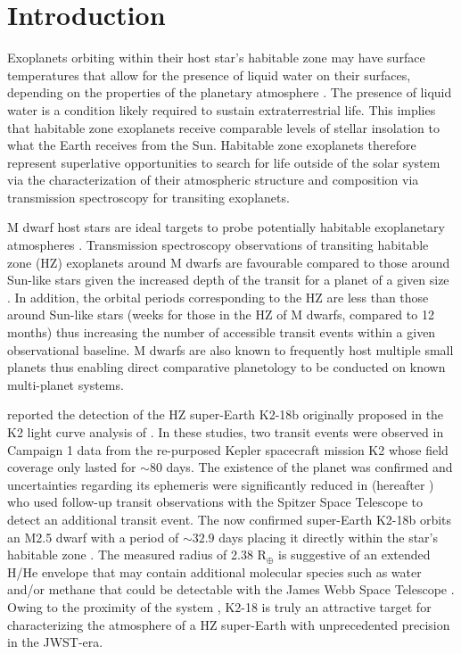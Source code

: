 \section{Introduction}
Exoplanets orbiting within their host star's habitable zone may have surface temperatures that allow
for the presence of liquid water on their surfaces, depending on the properties of the planetary
atmosphere \citep{kasting93}. The presence of liquid water is a condition likely required to sustain extraterrestrial life.
This implies that habitable zone exoplanets receive comparable levels of stellar insolation to what the Earth
receives from the Sun. Habitable zone exoplanets therefore represent superlative opportunities to
search for life outside of the solar system via the characterization of their atmospheric structure
and composition via transmission spectroscopy for transiting exoplanets.

M dwarf host stars are ideal targets to probe potentially habitable exoplanetary atmospheres
\citep[e.g.][]{kaltenegger11, rodler14}. 
Transmission spectroscopy observations of transiting habitable zone (HZ) exoplanets around
M dwarfs are favourable compared
to those around Sun-like stars given the increased depth of the transit for a planet of a given size 
\citep[e.g.][]{stevenson10, kreidberg14a}. In addition, the orbital periods corresponding to
the HZ are less than those around Sun-like stars (weeks for those in the HZ of M dwarfs, compared to 12 months)
thus increasing the number of accessible transit events within a given observational baseline.
M dwarfs are also known to frequently host multiple small planets
\citep[typically 2.5 planets per star with $0.5 \leq r_p/\text{R}_{\oplus} \leq 4$ and within 200 days;][]{dressing15a,gaidos16}
thus enabling direct comparative planetology to be conducted on known multi-planet systems.

\cite{montet15} reported the detection of the HZ super-Earth K2-18b originally proposed in
the K2 light curve analysis of \cite{foremanmackey15b}. In these studies,
two transit events were observed in Campaign 1 data from the
re-purposed Kepler spacecraft mission K2 whose field coverage only lasted for
$\sim 80$ days. The existence of the planet was
confirmed and uncertainties regarding its ephemeris were significantly reduced in
\cite{benneke17} (hereafter )
who used follow-up transit observations with the Spitzer Space Telescope to
detect an additional transit event. The now confirmed
super-Earth K2-18b orbits an M2.5 dwarf with a period of $\sim 32.9$ days placing it directly within
the star's habitable zone \citep{kopparapu13}. The measured radius of
2.38 R$_{\oplus}$ is suggestive of an extended H/He envelope \citep{valencia13, rogers15, fulton17} that may
contain additional molecular species such as water and/or methane that could be detectable with the
James Webb Space Telescope \citep[JWST;][]{beichman14}.
Owing to the proximity of the system
\citep[$\sim 34$ pc, $V=13.5$, $I=11.7$, $K=8.9$;][]{cutri03, zacharias13}, K2-18
is truly an attractive target for characterizing the atmosphere of a HZ super-Earth with
unprecedented precision in the JWST-era.

